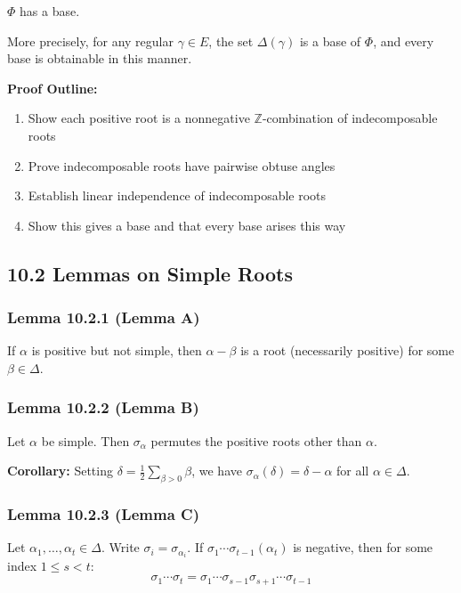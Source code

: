 $\Phi$ has a base.

More precisely, for any regular $\gamma \in E$, the set $\Delta(\gamma)$ is a base of $\Phi$, and every base is obtainable in this manner.

\textbf{Proof Outline:}

\begin{enumerate}
	\item Show each positive root is a nonnegative $\mathbb{Z}$-combination of indecomposable roots
	\item Prove indecomposable roots have pairwise obtuse angles
	\item Establish linear independence of indecomposable roots
	\item Show this gives a base and that every base arises this way
\end{enumerate}

\subsection{10.2 Lemmas on Simple Roots}

\subsubsection{Lemma 10.2.1 (Lemma A)}

If $\alpha$ is positive but not simple, then $\alpha - \beta$ is a root (necessarily positive) for some $\beta \in \Delta$.

\subsubsection{Lemma 10.2.2 (Lemma B)}

Let $\alpha$ be simple. Then $\sigma_\alpha$ permutes the positive roots other than $\alpha$.

\textbf{Corollary:} Setting $\delta = \frac{1}{2}\sum_{\beta>0} \beta$, we have $\sigma_\alpha(\delta) = \delta - \alpha$ for all $\alpha \in \Delta$.

\subsubsection{Lemma 10.2.3 (Lemma C)}

Let $\alpha_1, \ldots, \alpha_t \in \Delta$. Write $\sigma_i = \sigma_{\alpha_i}$. If $\sigma_1 \cdots \sigma_{t-1}(\alpha_t)$ is negative, then for some index $1 \leq s < t$:
\[
\sigma_1 \cdots \sigma_t = \sigma_1 \cdots \sigma_{s-1} \sigma_{s+1} \cdots \sigma_{t-1}
\]

